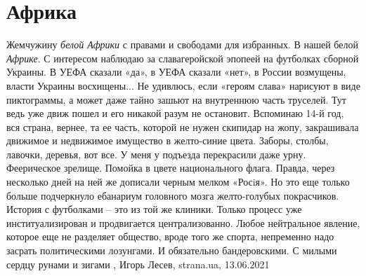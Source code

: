  
 
 
 
 
\chapter{Африка}

Жемчужину \emph{белой Африки} с правами и свободами для избранных.  В нашей
белой \emph{Африке}.  С интересом наблюдаю за славагеройской эпопеей на
футболках сборной Украины. В УЕФА сказали «да», в УЕФА сказали «нет», в России
возмущены, власти Украины восхищены... Не удивлюсь, если «героям слава» нарисуют
в виде пиктограммы, а может даже тайно зашьют на внутреннюю часть труселей. Тут
ведь уже движ пошел и его никакой разум не остановит.  Вспоминаю 14-й год, вся
страна, вернее, та ее часть, которой не нужен скипидар на жопу, закрашивала
движимое и недвижимое имущество в желто-синие цвета. Заборы, столбы, лавочки,
деревья, вот все. У меня у подъезда перекрасили даже урну. Феерическое зрелище.
Помойка в цвете национального флага. Правда, через несколько дней на ней же
дописали черным мелком «Росiя». Но это еще только больше подчеркнуло ебанариум
головного мозга желто-голубых покрасчиков. История с футболками – это из той
же клиники. Только процесс уже институализирован и продвигается
централизованно. Любое нейтральное явление, которое еще не разделяет общество,
вроде того же спорта, непременно надо засрать политическими лозунгами. И
обязательно бандеровскими. С милыми сердцу рунами и зигами
, 
Игорь Лесев, strana.ua, 13.06.2021

